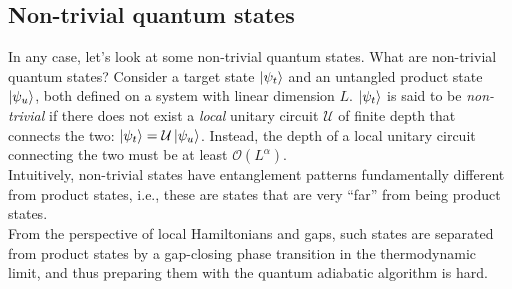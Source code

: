 \documentclass{book}
\theoremstyle{definition}
\newcommand{\al}{\alpha}
\newcommand{\U}{\mathcal{U}}
\begin{document}
\subsection{Non-trivial quantum states}


In any case, let's look at some non-trivial quantum states. What are non-trivial quantum states? Consider a target state $\ket{\psi_t}$ and an untangled product state $\ket{\psi_u}$, both defined on a system with linear dimension $L$. $\ket{\psi_t}$ is said to be \textit{non-trivial} if there does not exist a \textit{local} unitary circuit $\U$ of finite depth that connects the two: $\ket{\psi_t} = \U \ket{\psi_u}$. Instead, the depth of a local unitary circuit connecting the two must be at least $\mathcal{O}(L^\al)$. \\

Intuitively, non-trivial states have entanglement patterns fundamentally different from product states, i.e., these are states that are very ``far'' from being product states. \\

From the perspective of local Hamiltonians and gaps, such states are separated from product states by a gap-closing phase transition in the thermodynamic limit, and thus preparing them with the quantum adiabatic algorithm is hard.\\
\end{document}
